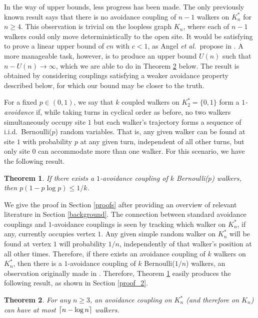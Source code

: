 \documentclass[11pt,reqno]{amsart} %
\numberwithin{equation}{section}
\newtheorem{thm}{Theorem}[section]
\theoremstyle{definition}
\DeclarePairedDelimiter\ceil{\lceil}{\rceil}
\begin{document}
In the way of upper bounds, less progress has been made.
The only previously known result \cite[Theorem 8.1]{angel-holroyd-martin-wilson-winkler13} says that there is no avoidance coupling of $n-1$ walkers on $K_n^*$ for $n\geq4$. 
This observation is trivial on the loopless graph $K_n$, where each of $n-1$ walkers could only move deterministically to the open site.
It would be satisfying to prove a linear upper bound of $cn$ with $c < 1$, as Angel \textit{et al.}~propose in \cite[Section 9]{angel-holroyd-martin-wilson-winkler13}.
A more manageable task, however, is to produce an upper bound $U(n)$ such that $n-U(n) \to \infty$, which we are able to do in Theorem \ref{ac_thm} below.
The result is obtained by considering couplings satisfying a weaker avoidance property described below, for which our  bound may be closer to the truth.

For a fixed $p \in (0,1)$, we say that $k$ coupled walkers on $K_2^* = \{0,1\}$ form a \textit{$1$-avoidance} if, while taking turns in cyclical order as before, no two walkers simultaneously occupy site $1$ but each walker's trajectory forms a sequence of i.i.d.~Bernoulli($p$) random variables.
That is, any given walker can be found at site $1$ with probability $p$ at any given turn, independent of all other turns, but only site $0$ can accommodate more than one walker.
For this scenario, we have the following result.

\begin{thm} \label{1a_thm}
If there exists a $1$-avoidance coupling of $k$ Bernoulli($p$) walkers, then $p(1-p\log p) \leq 1/k$.
\end{thm}

We give the proof in Section \ref{proofs} after providing an overview of relevant literature in Section \ref{background}.
The connection between standard avoidance couplings and $1$-avoidance couplings is seen by tracking which walker on $K_n^*$, if any, currently occupies vertex $1$.
Any given simple random walker on $K_n^*$ will be found at vertex $1$ will probability $1/n$, independently of that walker's position at all other times.
Therefore, if there exists an avoidance coupling of $k$ walkers on $K_n^*$, then there is a $1$-avoidance coupling of $k$ Bernoulli($1/n$) walkers, an observation originally made in \cite[Lemma 5.2]{angel-holroyd-martin-wilson-winkler13}.
Therefore, Theorem \ref{1a_thm} easily produces the following result, as shown in Section \ref{proof_2}. 

\begin{thm} \label{ac_thm}
For any $n \geq 3$, an avoidance coupling on $K_n^*$ (and therefore on $K_n$) can have at most $\ceil{n-\log n}$ walkers.
\end{thm}
\end{document}
